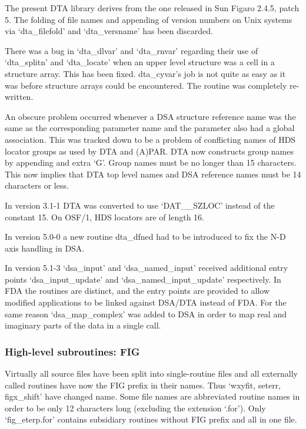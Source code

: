 \documentclass[11pt,twoside]{article}
\begin{document}
   The present DTA library derives from the one released in Sun Figaro
   2.4.5, patch 5. The folding of file names and appending of version
   numbers on Unix systems via `dta\_filefold' and `dta\_versname' has
   been discarded.

   There was a bug in `dta\_dlvar' and `dta\_rnvar' regarding their use of
   `dta\_splitn' and `dta\_locate' when an upper level structure was a
   cell in a structure array.  This has been fixed. dta\_cyvar's job is
   not quite as easy as it was before structure arrays could be
   encountered.  The routine was completely re-written.

   An obscure problem occurred whenever a DSA structure reference name
   was the same as the corresponding parameter name and the parameter
   also had a global association. This was tracked down to be a problem
   of conflicting names of HDS locator groups as used by DTA and (A)PAR.
   DTA now constructs group names by appending and extra `G'. Group
   names must be no longer than 15 characters. This now implies that DTA
   top level names and DSA reference names must be 14 characters or
   less.

   In version 3.1-1 DTA was converted to use `DAT\_\_SZLOC' instead of the
   constant 15.  On OSF/1, HDS locators are of length 16.

   In version 5.0-0 a new routine dta\_dfned had to be introduced to fix
   the N-D axis handling in DSA.

   In version 5.1-3 `dsa\_input' and `dsa\_named\_input' received
   additional entry points `dsa\_\-input\_\-update' and
   `dsa\_named\_input\_update' respectively. In FDA the routines are
   distinct, and the entry points are provided to allow modified
   applications to be linked against DSA/DTA instead of FDA. For the
   same reason `dsa\_map\_complex' was added to DSA in order to map real
   and imaginary parts of the data in a single call.


\subsubsection{\label{changessub7}High-level subroutines: FIG}

   Virtually all source files have been split into single-routine files
   and all externally called routines have now the FIG prefix in their
   names. Thus `wxyfit, seterr, figx\_shift' have changed name.  Some
   file names are abbreviated routine names in order to be only 12
   characters long (excluding the extension `.for').  Only
   `fig\_eterp.for' contains subsidiary routines without FIG prefix and
   all in one file.
\end{document}
